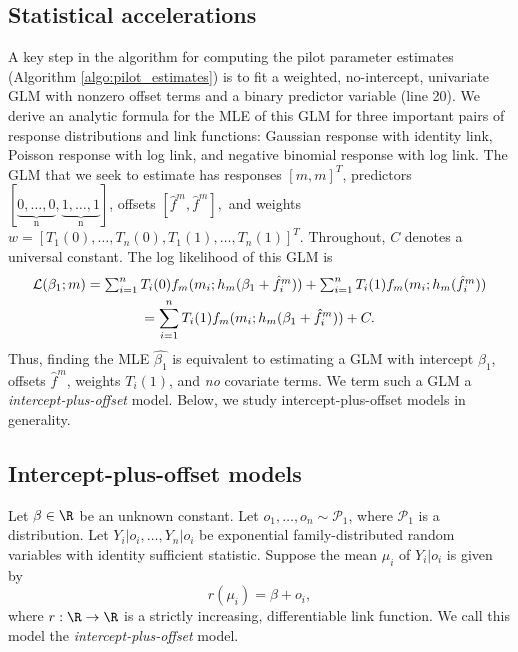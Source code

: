 \documentclass[12pt]{article}
\begin{document}
\begin{appendices}
\section{Statistical accelerations}
A key step in the algorithm for computing the pilot parameter estimates (Algorithm \ref{algo:pilot_estimates}) is to fit a weighted, no-intercept, univariate GLM with nonzero offset terms and a binary predictor variable (line 20). We derive an analytic formula for the MLE of this GLM for three important pairs of response distributions and link functions: Gaussian response with identity link, Poisson response with log link, and negative binomial response with log link. The GLM that we seek to estimate has responses $[m,m]^T$, predictors $[\underbrace{0, \dots, 0}_\textrm{n}, \underbrace{1, \dots, 1}_\textrm{n}]$, offsets $[\hat{f}^m, \hat{f}^m],$ and weights $w = [T_1(0), \dots, T_n(0), T_1(1), \dots, T_n(1)]^T.$ Throughout, $C$ denotes a universal constant. The log likelihood of this GLM is
\begin{multline}\label{stat_acc_1}
$$\mathcal{L}(\beta_1; m) = \sum_{i=1}^n T_i(0) f_m(m_i; h_m(\beta_1 + \hat{f}^m_i )) + \sum_{i=1}^n T_i(1) f_m(m_i; h_m(\hat{f}^m_i)) \\ = \sum_{i=1}^n T_i(1) f_m(m_i; h_m(\beta_1 + \hat{f}^m_i )) + C.$$
\end{multline}
Thus, finding the MLE $\hat{\beta_1}$ is equivalent to estimating a GLM with intercept $\beta_1$, offsets $\hat{f}^m$, weights $T_i(1)$, and \textit{no} covariate terms. We term such a GLM a \textit{intercept-plus-offset} model. Below, we study intercept-plus-offset models in generality.

\subsection*{Intercept-plus-offset models}
Let $\beta \in \R$ be an unknown constant. Let $o_1, \dots, o_n \sim \mathcal{P}_1$, where $\mathcal{P}_1$ is a distribution. Let $Y_i|o_i, \dots, Y_n|o_i$ be exponential family-distributed random variables with identity sufficient statistic. Suppose the mean $\mu_i$ of $Y_i|o_i$ is given by $$r(\mu_i) = \beta + o_i,$$ where $r: \R \to \R$ is a strictly increasing, differentiable link function. We call this model the \textit{intercept-plus-offset} model.


\end{appendices}
\end{document}

